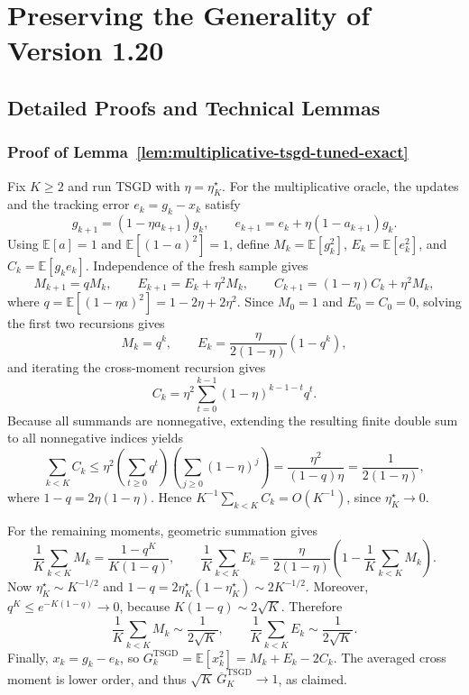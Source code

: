 \section{Preserving the Generality of Version 1.20}
\mbox{}\par

\subsection{Detailed Proofs and Technical Lemmas}
\label{app:detailed-proofs}

\subsubsection{Proof of Lemma~\ref{lem:multiplicative-tsgd-tuned-exact}}
\label{app:proof-multiplicative-tsgd-tuned}

Fix $K\geq2$ and run TSGD with $\eta=\eta_K^\star$. For the
multiplicative oracle, the updates and the tracking error
$e_k=g_k-x_k$ satisfy
\[
g_{k+1}=(1-\eta a_{k+1})g_k,
\qquad
e_{k+1}=e_k+\eta(1-a_{k+1})g_k.
\]
Using $\mathbb E[a]=1$ and $\mathbb E[(1-a)^2]=1$, define
$M_k=\mathbb E[g_k^2]$, $E_k=\mathbb E[e_k^2]$, and
$C_k=\mathbb E[g_ke_k]$. Independence of the fresh sample gives
\[
M_{k+1}=qM_k,\qquad
E_{k+1}=E_k+\eta^2M_k,\qquad
C_{k+1}=(1-\eta)C_k+\eta^2M_k,
\]
where $q=\mathbb E[(1-\eta a)^2]=1-2\eta+2\eta^2$.
Since $M_0=1$ and $E_0=C_0=0$, solving the first two recursions
gives
\[
M_k=q^k,\qquad
E_k=\frac{\eta}{2(1-\eta)}(1-q^k),
\]
and iterating the cross-moment recursion gives
\[
C_k=\eta^2\sum_{t=0}^{k-1}(1-\eta)^{k-1-t}q^t.
\]
Because all summands are nonnegative, extending the resulting
finite double sum to all nonnegative indices yields
\[
\sum_{k<K}C_k
\leq\eta^2\left(\sum_{t\geq0}q^t\right)
             \left(\sum_{j\geq0}(1-\eta)^j\right)
=\frac{\eta^2}{(1-q)\eta}
=\frac{1}{2(1-\eta)},
\]
where $1-q=2\eta(1-\eta)$. Hence
$K^{-1}\sum_{k<K}C_k=O(K^{-1})$, since $\eta_K^\star\to0$.

For the remaining moments, geometric summation gives
\[
\frac1K\sum_{k<K}M_k=\frac{1-q^K}{K(1-q)},\qquad
\frac1K\sum_{k<K}E_k=
\frac{\eta}{2(1-\eta)}
\left(1-\frac1K\sum_{k<K}M_k\right).
\]
Now $\eta_K^\star\sim K^{-1/2}$ and
$1-q=2\eta_K^\star(1-\eta_K^\star)\sim2K^{-1/2}$.
Moreover, $q^K\leq e^{-K(1-q)}\to0$, because
$K(1-q)\sim2\sqrt K$. Therefore
\[
\frac1K\sum_{k<K}M_k\sim\frac{1}{2\sqrt K},
\qquad
\frac1K\sum_{k<K}E_k\sim\frac{1}{2\sqrt K}.
\]
Finally, $x_k=g_k-e_k$, so
$G_k^{\mathrm{TSGD}}=\mathbb E[x_k^2]=M_k+E_k-2C_k$.
The averaged cross moment is lower order, and thus
$\sqrt K\,\overline G_K^{\mathrm{TSGD}}\to1$, as claimed.

